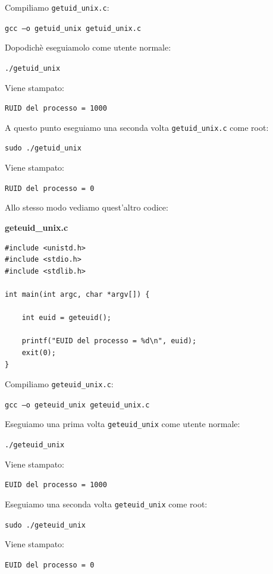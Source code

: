 Compiliamo \texttt{getuid\_unix.c}:
\begin{center}
    \texttt{gcc –o getuid\_unix getuid\_unix.c}
\end{center}
Dopodichè eseguiamolo come utente normale:
\begin{center}
    \texttt{./getuid\_unix}
\end{center}
Viene stampato:

\texttt{RUID del processo = 1000}

A questo punto eseguiamo una seconda volta \texttt{getuid\_unix.c} come root:

\begin{center}
    \texttt{sudo ./getuid\_unix}
\end{center}

Viene stampato:

\texttt{RUID del processo = 0}

Allo stesso modo vediamo quest'altro codice:

\begin{mdframed}[backgroundcolor=white!20,shadow=false]
\textbf{geteuid\_unix.c}

\begin{verbatim}
#include <unistd.h>
#include <stdio.h>
#include <stdlib.h>

int main(int argc, char *argv[]) {

	int euid = geteuid();

	printf("EUID del processo = %d\n", euid);
	exit(0);
}

\end{verbatim}
\end{mdframed}
Compiliamo \texttt{geteuid\_unix.c}:
\begin{center}
    \texttt{gcc –o geteuid\_unix geteuid\_unix.c}
\end{center}
Eseguiamo una prima volta \texttt{geteuid\_unix} come utente normale:

\begin{center}
    \texttt{./geteuid\_unix}
\end{center}
Viene stampato:

\texttt{EUID del processo = 1000}

Eseguiamo una seconda volta \texttt{geteuid\_unix} come root:

\begin{center}
    \texttt{sudo ./geteuid\_unix}
\end{center}
Viene stampato:

\texttt{EUID del processo = 0}

